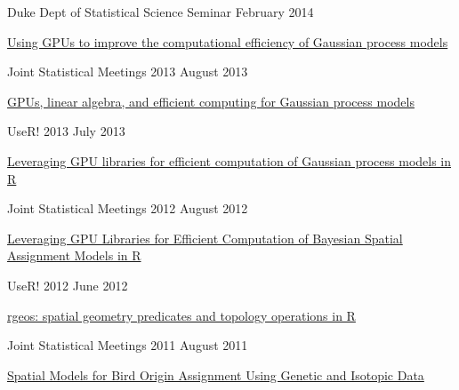 \documentclass[margin,line]{res}
\begin{document}
\begin{resume}
Duke Dept of Statistical Science Seminar \hfill February 2014
\begin{list1}
\item[] \href{https://github.com/rundel/Presentations/tree/master/Duke%202014}{Using GPUs to improve the computational efficiency of Gaussian process models}
\end{list1}
\vspace{-3mm}


Joint Statistical Meetings 2013 \hfill August 2013
\begin{list1}
\item[] \href{https://github.com/rundel/Presentations/tree/master/JSM%202013}{GPUs, linear algebra, and efficient computing for Gaussian process models}
\end{list1}
\vspace{-3mm}

UseR! 2013 \hfill July 2013
\begin{list1}
\item[] \href{https://github.com/rundel/Presentations/tree/master/UseR2013}{Leveraging GPU libraries for efficient computation of Gaussian process models in R}
\end{list1}
\vspace{-3mm}

Joint Statistical Meetings 2012 \hfill August 2012
\begin{list1}
\item[] \href{https://github.com/rundel/Presentations/tree/master/JSM%202012}{Leveraging GPU Libraries for Efficient Computation of Bayesian Spatial Assignment Models in R}
\end{list1}
\vspace{-3mm}

UseR! 2012 \hfill June 2012
\begin{list1}
\item[] \href{https://github.com/rundel/Presentations/tree/master/UseR2012}{rgeos: spatial geometry predicates and topology operations in R}
\end{list1}
\vspace{-3mm}

Joint Statistical Meetings 2011 \hfill August 2011
\begin{list1}
\item[] \href{https://github.com/rundel/Presentations/tree/master/JSM%202011}{Spatial Models for Bird Origin Assignment Using Genetic and Isotopic Data}
\end{list1}
\vspace{-3mm}


\end{resume}
\end{document}
